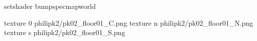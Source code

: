setshader bumpspecmapworld

texture 0 philipk2/pk02_floor01_C.png
texture n philipk2/pk02_floor01_N.png
texture s philipk2/pk02_floor01_S.png

